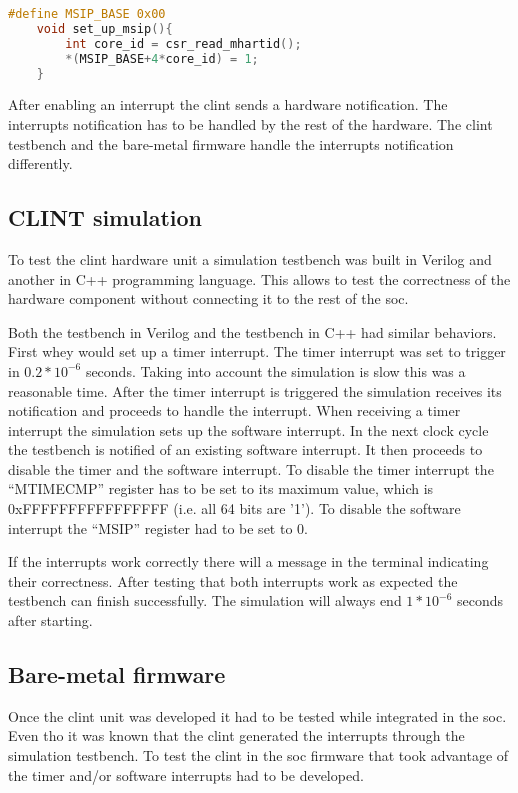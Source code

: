 \begin{lstlisting}[language=C, caption={Set Up Software Interrupt.}, label=lst:set_up_msip]
    #define MSIP_BASE 0x00
    void set_up_msip(){
        int core_id = csr_read_mhartid();
        *(MSIP_BASE+4*core_id) = 1;
    }
\end{lstlisting}

After enabling an interrupt the \acrshort{clint} sends a hardware notification. The interrupts notification has to be handled by the rest of the hardware. The \acrshort{clint} testbench and the bare-metal firmware handle the interrupts notification differently.

\subsection{CLINT simulation}
To test the \acrshort{clint} hardware unit a simulation testbench was built in Verilog and another in C++ programming language. This allows to test the correctness of the hardware component without connecting it to the rest of the \acrshort{soc}.

Both the testbench in Verilog and the testbench in C++ had similar behaviors. First whey would set up a timer interrupt. The timer interrupt was set to trigger in $0.2*10^{-6}$ seconds. Taking into account the simulation is slow this was a reasonable time. After the timer interrupt is triggered the simulation receives its notification and proceeds to handle the interrupt. When receiving a timer interrupt the simulation sets up the software interrupt. In the next clock cycle the testbench is notified of an existing software interrupt. It then proceeds to disable the timer and the software interrupt. To disable the timer interrupt the \enquote{MTIMECMP} register has to be set to its maximum value, which is 0xFFFFFFFFFFFFFFFF (i.e. all 64 bits are '1'). To disable the software interrupt the \enquote{MSIP} register had to be set to 0.

If the interrupts work correctly there will a message in the terminal indicating their correctness. After testing that both interrupts work as expected the testbench can finish successfully. The simulation will always end $1*10^{-6}$ seconds after starting.

\subsection{Bare-metal firmware}
Once the \acrshort{clint} unit was developed it had to be tested while integrated in the \acrshort{soc}. Even tho it was known that the \acrshort{clint} generated the interrupts through the simulation testbench. To test the \acrshort{clint} in the \acrshort{soc} firmware that took advantage of the timer and/or software interrupts had to be developed. 


